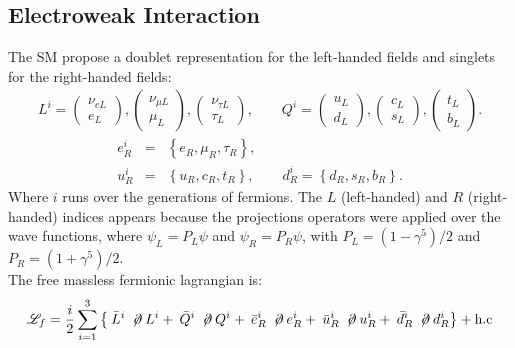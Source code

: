 \subsection{Electroweak Interaction}

The SM propose a doublet representation for the left-handed fields and singlets for the right-handed fields:
\begin{eqnarray}
L^{i}=\left(
\begin{array}{c}
\displaystyle \nu_{e L}\\
\displaystyle e_{L}
\end{array}\right),
\left(
\begin{array}{c}
\displaystyle \nu_{\mu L}\\
\displaystyle \mu_{L}
\end{array}\right),
\left(
\begin{array}{c}
\displaystyle \nu_{\tau L}\\
\displaystyle \tau_{L}
\end{array}\right),
\qquad
Q^{i}=\left(
\begin{array}{c}
\displaystyle u_{L}\\
\displaystyle d_{L}
\end{array}\right),
\left(
\begin{array}{c}
\displaystyle c_{L}\\
\displaystyle s_{L}
\end{array}\right),
\left(
\begin{array}{c}
\displaystyle t_{L}\\
\displaystyle b_{L}
\end{array}\right).        
\end{eqnarray}
\begin{eqnarray}
e_{R}^{i} &=& \left\lbrace e_{R}, \mu_{R}, \tau_{R} \right\rbrace ,  \nonumber\\
u_{R}^{i} &=& \left\lbrace u_{R}, c_{R}, t_{R} \right\rbrace , \qquad d_{R}^{i} = \left\lbrace d_{R}, s_{R}, b_{R} \right\rbrace .
\end{eqnarray}
Where $i$ runs over the generations of fermions. The $L$ (left-handed) and $R$ (right-handed) indices appears because the projections operators were applied over the wave functions, where $\psi_{L}=P_{L}\psi$ and $\psi_{R}=P_{R}\psi$, with $P_{L}=(1-\gamma^{5})/2$ and $P_{R}=(1+\gamma^{5})/2$.\\
The free massless fermionic lagrangian is:
\begin{displaymath} 
\mathscr{L}_{f}=\frac{i}{2}\sum^{3}_{i=1}\left\{\:\bar{L}^{i}\:\not\! \partial\:L^{i}+\:  \bar{Q}^{i}\:\not\! \partial\:Q^{i}+\:\bar{e}_{R}^{i}\:\not\! \partial\:e_{R}^{i} + \:\bar{u}_{R}^{i}\:\not\! \partial\:u_{R}^{i} + \:\bar{d}_{R}^{i}\:\not\! \partial\:d_{R}^{i}  \right\}+\hbox{h.c}
\end{displaymath}
